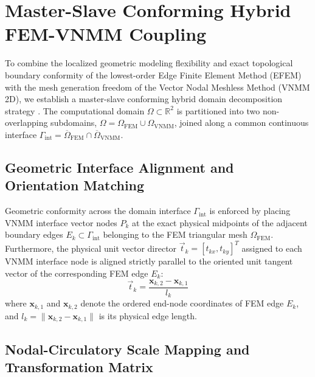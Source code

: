 \documentclass[preprint,12pt]{elsarticle}
\begin{document}
\section{Master-Slave Conforming Hybrid FEM-VNMM Coupling}
\label{sec:hybrid_coupling}

To combine the localized geometric modeling flexibility and exact topological boundary conformity of the lowest-order Edge Finite Element Method (EFEM) \cite{nedelec1980mixed, monk2003finite} with the mesh generation freedom  of the Vector Nodal Meshless Method (VNMM 2D), we establish a master-slave conforming hybrid domain decomposition strategy \cite{tsukerman1992overlapping, elkadmiri2022hybrid}. The computational domain $\Omega \subset \mathbb{R}^2$ is partitioned into two non-overlapping subdomains, $\Omega = \Omega_{\mathrm{FEM}} \cup \Omega_{\mathrm{VNMM}}$, joined along a common continuous interface $\Gamma_{\mathrm{int}} = \overline{\Omega}_{\mathrm{FEM}} \cap \overline{\Omega}_{\mathrm{VNMM}}$.

\subsection{Geometric Interface Alignment and Orientation Matching}
\label{subsec:geometric_interface}

Geometric conformity across the domain interface $\Gamma_{\mathrm{int}}$ is enforced by placing VNMM interface vector nodes $P_k$ at the exact physical midpoints of the adjacent boundary edges $E_k \subset \Gamma_{\mathrm{int}}$ belonging to the FEM triangular mesh $\Omega_{\mathrm{FEM}}$. Furthermore, the physical unit vector director $\vec{t}_k = [t_{kx}, t_{ky}]^T$ assigned to each VNMM interface node is aligned strictly parallel to the oriented unit tangent vector of the corresponding FEM edge $E_k$:
\begin{equation}
\vec{t}_k = \frac{\mathbf{x}_{k,2} - \mathbf{x}_{k,1}}{l_k}
\label{eq:interface_director_alignment}
\end{equation}
where $\mathbf{x}_{k,1}$ and $\mathbf{x}_{k,2}$ denote the ordered end-node coordinates of FEM edge $E_k$, and $l_k = \|\mathbf{x}_{k,2} - \mathbf{x}_{k,1}\|$ is its physical edge length.

\subsection{Nodal-Circulatory Scale Mapping and Transformation Matrix}
\label{subsec:scale_mapping}
\end{document}
